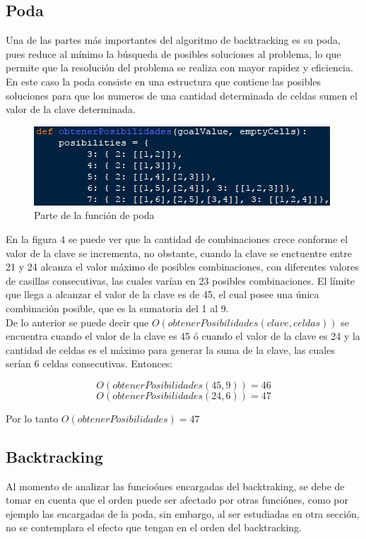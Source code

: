 \documentclass[journal]{IEEEtran}
\begin{document}
\subsection{Poda}
Una de las partes más importantes del algoritmo de backtracking es su poda, pues reduce al mínimo la búsqueda de posibles soluciones al problema, lo que permite que la resolución del problema se realiza con mayor rapidez y eficiencia.\\
En este caso la poda consiste en una estructura que contiene las posibles soluciones para que los numeros de una cantidad determinada de celdas sumen el valor de la clave determinada.

\begin{figure}[h] 
        \centering \includegraphics[width=.9\columnwidth]{obtenerPosibilidades.png}
        \caption{
                \label{fig:samplesetup}
                Parte de la función de poda
        }
\end{figure}

En la figura 4 se puede ver que la cantidad de combinaciones crece conforme el valor de la clave se incrementa, no obstante, cuando la clave se enctuentre entre 21 y 24 alcanza el valor máximo de posibles combinaciones, con diferentes valores de casillas consecutivas, las cuales varían en 23 posibles combinaciones. El límite que llega a alcanzar el valor de la clave es de 45, el cual posee una única combinación posible, que es la sumatoria del 1 al 9.\\
De lo anterior se puede decir que $O(obtenerPosibilidades(clave, celdas))$ se encuentra cuando el valor de la clave es 45 ó cuando el valor de la clave es 24 y la cantidad de celdas es el máximo para generar la suma de la clave, las cuales serían 6 celdas consecutivas. Entonces:

\[O(obtenerPosibilidades(45, 9))=46\]
\[O(obtenerPosibilidades(24, 6))=47\]

Por lo tanto $O(obtenerPosibilidades)=47$

\subsection{Backtracking}
Al momento de analizar las funcio\'{o}nes encargadas del backtraking, se debe de tomar en cuenta que el orden puede ser afectado por otras funci\'{o}nes, como por ejemplo las encargadas de la poda, sin embargo, al ser estudiadas en otra secci\'{o}n, no se contemplara el efecto que tengan en el orden del backtracking.\\
\end{document}
